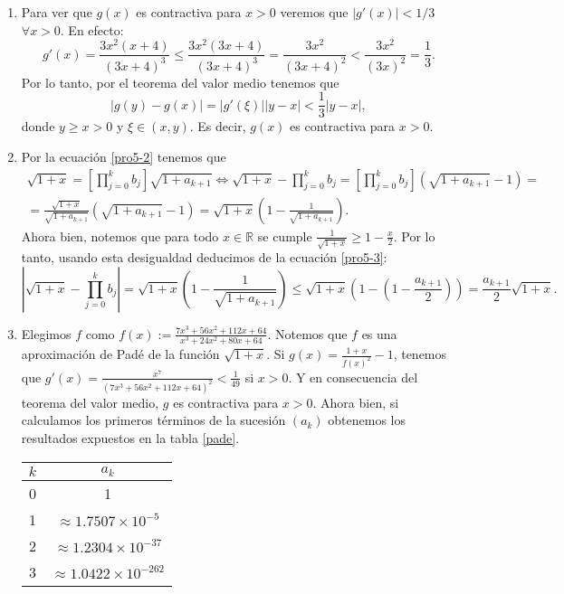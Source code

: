 \documentclass[a4paper]{article}
\begin{document}
\begin{enumerate}
    \item Para ver que $g(x)$ es contractiva para $x>0$ veremos que $|g'(x)|<1/3$ $\forall x>0$. En efecto:
    $$g'(x)=\frac{3x^2(x+4)}{(3x+4)^3}\leq\frac{3x^2(3x+4)}{(3x+4)^3}=\frac{3x^2}{(3x+4)^2}<\frac{3x^2}{(3x)^2}=\frac{1}{3}.$$
    Por lo tanto, por el teorema del valor medio tenemos que $$|g(y)-g(x)|=|g'(\xi)||y-x|<\frac{1}{3}|y-x|,$$ donde $y\geq x>0$ y $\xi\in(x,y)$. Es decir, $g(x)$ es contractiva para $x>0$.
    \item\label{f} Por la ecuación \eqref{pro5-2} tenemos que 
    \begin{multline}
    \sqrt{1+x}=\left[\prod_{j=0}^kb_j\right]\sqrt{1+a_{k+1}}\iff\sqrt{1+x}-\prod_{j=0}^kb_j=\left[\prod_{j=0}^kb_j\right]\left(\sqrt{1+a_{k+1}}-1\right)=\\=\frac{\sqrt{1+x}}{\sqrt{1+a_{k+1}}}\left(\sqrt{1+a_{k+1}}-1\right)=\sqrt{1+x}\left(1-\frac{1}{\sqrt{1+a_{k+1}}}\right).
    \label{pro5-3}
    \end{multline}
    Ahora bien, notemos que para todo $x\in\mathbb{R}$ se cumple $\frac{1}{\sqrt{1+x}}\geq1-\frac{x}{2}$. Por lo tanto, usando esta desigualdad deducimos de la ecuación \eqref{pro5-3}: $$\left|\sqrt{1+x}-\prod_{j=0}^kb_j\right|=\sqrt{1+x}\left(1-\frac{1}{\sqrt{1+a_{k+1}}}\right)\leq\sqrt{1+x}\left(1-\left(1-\frac{a_{k+1}}{2}\right)\right)=\frac{a_{k+1}}{2}\sqrt{1+x}.$$
    \item Elegimos $f$ como $f(x):=\frac{7x^3+56x^2+112x+64}{x^3+24x^2+80x+64}$. Notemos que $f$ es una aproximación de Padé de la función $\sqrt{1+x}$. Si $g(x)=\frac{1+x}{f(x)^2}-1$, tenemos que $g'(x)=\frac{x^7}{(7x^3 + 56x^2 + 112x + 64)^2}<\frac{1}{49}$ si $x>0$. Y en consecuencia del teorema del valor medio, $g$ es contractiva para $x>0$. Ahora bien, si calculamos los primeros términos de la sucesión $(a_k)$ obtenemos los resultados expuestos en la tabla \ref{pade}.\par
    \begin{table}[ht]
        \centering
        \begin{tabular}{|c|c|}
            \hline
            $k$ & $a_k$ \\
            \hline
            \hline
            0 & 1\\
            \hline
            1 & $\approx1.7507\times10^{-5}$ \\
            \hline
            2 & $\approx1.2304\times10^{-37}$ \\
            \hline
            3 & $\approx1.0422\times10^{-262}$ \\

\end{tabular}
\end{table}
\end{enumerate}
\end{document}
